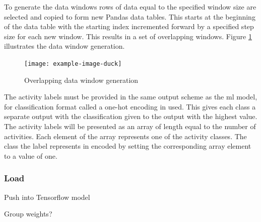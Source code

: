 To generate the data windows rows of data equal to the specified window size are selected and copied to form new Pandas data tables. This starts at the beginning of the data table with the starting index incremented forward by a specified step size for each new window. This results in a set of overlapping windows. Figure \ref{fig:methods-data-window-generation} illustrates the data window generation.

\begin{figure}[!hbt]
    \centering
    \texttt{[image: example-image-duck]}
    \caption{Overlapping data window generation}
    \label{fig:methods-data-window-generation}
\end{figure}

The activity labels must be provided in the same output scheme as the \acrshort{ml} model, for classification format called a one-hot encoding in used. This gives each class a separate output with the classification given to the output with the highest value. The activity labels will be presented as an array of length equal to the number of activities. Each element of the array represents one of the activity classes. The class the label represents in encoded by setting the corresponding array element to a value of one.


\subsubsection{Load}
Push into Tensorflow model

Group weights?


